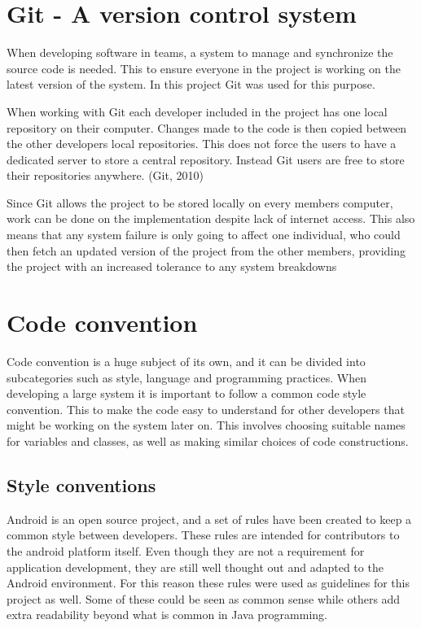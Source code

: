 \section{Git - A version control system}

When developing software in teams, a system to manage and synchronize the source code is needed. This to ensure everyone in the project is working on the latest version of the system. In this project Git was used for this purpose. 

When working with Git each developer included in the project has one local repository on their computer. Changes made to the code is then copied between the other developers local repositories. This does not force the users to have a dedicated server to store a central repository. Instead Git users are free to store their repositories anywhere. (Git, 2010) 

Since Git allows the project to be stored locally on every members computer, work can be done on the implementation despite lack of internet access. This also means that any system failure is only going to affect one individual, who could then fetch an updated version of the project from the other members, providing the project with an increased tolerance to any system breakdowns
\section{Code convention}

Code convention is a huge subject of its own, and it can be divided into subcategories such as style, language and programming practices. When developing a large system it is important to follow a common code style convention. This to make the code easy to understand for other developers that might be working on the system later on. This involves choosing suitable names for variables and classes, as well as making similar choices of code constructions. 

\subsection{Style conventions}

Android is an open source project, and a set of rules have been created to keep a common style between developers. These rules are intended for contributors to the android platform itself. Even though they are not a requirement for application development, they are still well thought out and adapted to the Android environment. For this reason these rules were used as guidelines for this project as well. Some of these could be seen as common sense while others add extra readability beyond what is common in Java programming.


